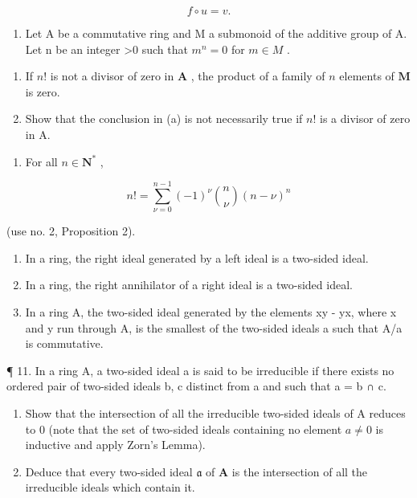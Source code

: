 \[
f \circ u = v.
\]

\begin{enumerate}
\def\labelenumi{\arabic{enumi}.}
\setcounter{enumi}{5}
\tightlist
\item
  Let A be a commutative ring and M a submonoid of the additive group of A. Let n be an integer \textgreater0 such that \(m^{n} = 0\) for \(m \in M\) .
\end{enumerate}

\begin{enumerate}
\def\labelenumi{(\alph{enumi})}
\item
  If \(n!\) is not a divisor of zero in \(\mathbf{A}\) , the product of a family of \(n\) elements of \(\mathbf{M}\) is zero.
\item
  Show that the conclusion in (a) is not necessarily true if \(n!\) is a divisor of zero in A.
\end{enumerate}

\begin{enumerate}
\def\labelenumi{\arabic{enumi}.}
\setcounter{enumi}{6}
\tightlist
\item
  For all \(n \in \mathbf{N}^*\) ,
\end{enumerate}

\[
n! = \sum_ {\nu = 0} ^ {n - 1} (- 1) ^ {\nu} \binom {n} {\nu} (n - \nu) ^ {n}
\]

(use no. 2, Proposition 2).

\begin{enumerate}
\def\labelenumi{\arabic{enumi}.}
\setcounter{enumi}{7}
\item
  In a ring, the right ideal generated by a left ideal is a two-sided ideal.
\item
  In a ring, the right annihilator of a right ideal is a two-sided ideal.
\item
  In a ring A, the two-sided ideal generated by the elements xy - yx, where x and y run through A, is the smallest of the two-sided ideals a such that A/a is commutative.
\end{enumerate}

¶ 11. In a ring A, a two-sided ideal a is said to be irreducible if there exists no ordered pair of two-sided ideals b, c distinct from a and such that a = b ∩ c.

\begin{enumerate}
\def\labelenumi{(\alph{enumi})}
\item
  Show that the intersection of all the irreducible two-sided ideals of A reduces to 0 (note that the set of two-sided ideals containing no element \(a \neq 0\) is inductive and apply Zorn's Lemma).
\item
  Deduce that every two-sided ideal \(\mathfrak{a}\) of \(\mathbf{A}\) is the intersection of all the irreducible ideals which contain it.
\end{enumerate}

